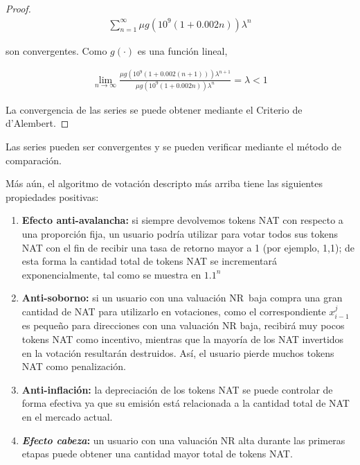\begin{proof}
	\begin{align}
	\sum_{n=1}^{\infty} \mu g(10^9(1+0.002n))\lambda^n
	\end{align}

	son convergentes. Como $g(\cdot)$ es una función lineal,

	\begin{align}
	\lim_{n\rightarrow \infty} \frac{\mu g(10^9(1+0.002(n+1)))\lambda^{n+1}}{\mu g(10^9(1+ 0.002n))\lambda^n} = \lambda <1
	\end{align}

	La convergencia de las series se puede obtener mediante el Criterio de d'Alembert.
\end{proof}

Las series pueden ser convergentes y se pueden verificar mediante el método de comparación.

Más aún, el algoritmo de votación descripto más arriba tiene las siguientes propiedades positivas:

\begin{enumerate}
	\item \textbf{Efecto anti-avalancha:} si siempre devolvemos tokens NAT con respecto a una proporción fija, un usuario podría utilizar para votar todos sus tokens NAT con el fin de recibir una tasa de retorno mayor a 1 (por ejemplo, 1,1); de esta forma la cantidad total de tokens NAT se incrementará exponencialmente, tal como se muestra en $1.1^n$
	\item \textbf{Anti-soborno:} si un usuario con una valuación NR baja compra una gran cantidad de NAT para utilizarlo en votaciones, como el correspondiente $x_{i-1}^j$ es pequeño para direcciones con una valuación NR baja, recibirá muy pocos tokens NAT como incentivo, mientras que la mayoría de los NAT invertidos en la votación resultarán destruidos. Así, el usuario pierde muchos tokens NAT como penalización.
	\item \textbf{Anti-inflación:} la depreciación de los tokens NAT se puede controlar de forma efectiva ya que su emisión está relacionada a la cantidad total de NAT en el mercado actual.
	\item \textbf{\textit{Efecto cabeza}:} un usuario con una valuación NR alta durante las primeras etapas puede obtener una cantidad mayor total de tokens NAT.
\end{enumerate}